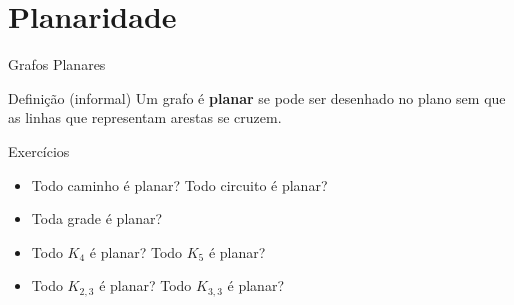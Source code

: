 \documentclass[xcolor=dvipsnames,table]{beamer}
\begin{document}
	\section{Planaridade}
	\begin{frame}{Grafos Planares}
		\begin{block}{Definição (informal)}
			Um grafo é {\bf planar} se pode ser desenhado no plano sem que as linhas que representam arestas se cruzem.
		\end{block} \pause
		\begin{block}{Exercícios}
			\begin{itemize}
				\item Todo caminho é planar? Todo circuito é planar? \pause
				\item Toda grade é planar? \pause
				\item Todo $K_4$ é planar? Todo $K_5$ é planar? \pause
				\item Todo $K_{2,3}$ é planar? Todo $K_{3,3}$ é planar?
			\end{itemize}
		\end{block}
	\end{frame}
	
	\begin{frame}
		\titlepage
	\end{frame}
	
\end{document}
